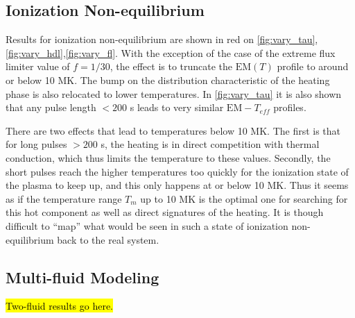 \documentclass[apj]{emulateapj}
\begin{document}
	\subsection{Ionization Non-equilibrium}
	\label{subsec:nei_res}
	\par Results for ionization non-equilibrium are shown in red on \autoref{fig:vary_tau},\autoref{fig:vary_hdl},\autoref{fig:vary_fl}. With the exception of the case of the extreme flux limiter value of $f = 1/30$, the effect is to truncate the $\mathrm{EM}(T)$ profile to around or below 10 MK. The bump on the distribution characteristic of the heating phase is also relocated to lower temperatures. In \autoref{fig:vary_tau} it is also shown that any pulse length $< 200$ s leads to very similar $\mathrm{EM}-T_{eff}$ profiles.
	\par There are two effects that lead to temperatures below 10 MK. The first is that for long pulses $> 200$ s, the heating is in direct competition with thermal conduction, which thus limits the temperature to these values. Secondly, the short pulses reach the higher temperatures too quickly for the ionization state of the plasma to keep up, and this only happens at or below 10 MK. Thus it seems as if the temperature range $T_m$ up to 10 MK is the optimal one for searching for this hot component as well as direct signatures of the heating. It is though difficult to ``map'' what would be seen in such a state of ionization non-equilibrium back to the real system.
	\subsection{Multi-fluid Modeling}
	\label{subsec:two_fluid_res}
	\hl{Two-fluid results go here.}
\end{document}
